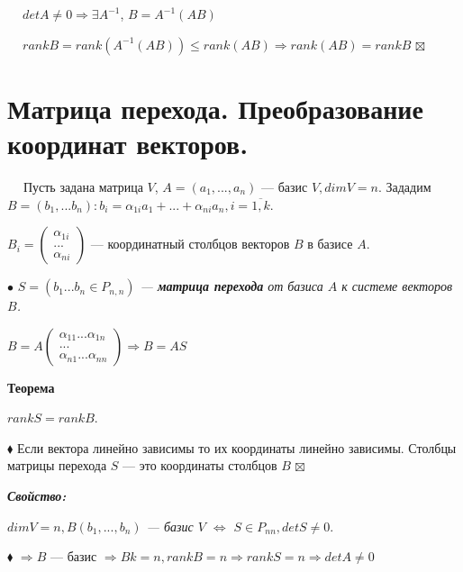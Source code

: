\documentclass[a4paper, 12pt]{report}
\begin{document}
	$\quad \ detA \ne 0 \Rightarrow \exists A^{-1}$, 
	$B = A^{-1}(AB)$
	
	$\quad \ rankB = rank(A^{-1}(AB)) \leqslant rank(AB) \Rightarrow rank(AB) = rankB$  $\boxtimes$
	
	
	
	
	
	
	
	
	
	
	
	
	
	
	
	
	
	
	\section{Матрица перехода. Преобразование координат векторов.}
	
	$\quad \;$Пусть задана матрица $V$, $A=(a_{1}, ... , a_{n})$ --- базис $V, dimV = n$.
	Зададим $B=(b_{1}, ... b_{n}): b_{i} = \alpha_{1i}a_{1} + ... + \alpha_{ni}a_{n}, i = \overline{1, k}$.
	\par\bigskip
	$B_{i} = \begin{pmatrix} \alpha_{1i}
		\\ ...
		\\ \alpha_{ni}
	\end{pmatrix}$ --- координатный столбцов векторов $B$ в базисе $A$.
	
	$\bullet$ \textit{$S = (b_{1} ... b_{n} \in P_{n,n})$ --- \textbf{матрица перехода} от базиса $A$ к системе векторов $B$.}
	
	$B = A\begin{pmatrix} \alpha_{11} ... \alpha_{1n}
		\\ ...
		\\ \alpha_{n1} ... \alpha_{nn}
	\end{pmatrix} \Rightarrow B = AS$
	\par\bigskip
	\textbf{Теорема}
	
	\textit{$rankS = rankB$}.
	\par\bigskip
	$\blacklozenge$ Если вектора линейно зависимы то их координаты линейно зависимы. Столбцы матрицы перехода $S$ --- это координаты столбцов $B$ $\boxtimes$
	\par\bigskip
	\textit{\textbf{Свойство:}}
	
	\textit{$dimV = n, B(b_{1}, ... , b_{n})$ --- базис $V$ $\Leftrightarrow$ $S \in P_{nn}, detS \ne 0$}.
	\par\bigskip
	$\blacklozenge$ $\Rightarrow B$ --- базис $\Rightarrow Bk = n, rankB = n \Rightarrow rankS = n \Rightarrow detA \ne 0$ 
	
\end{document}
